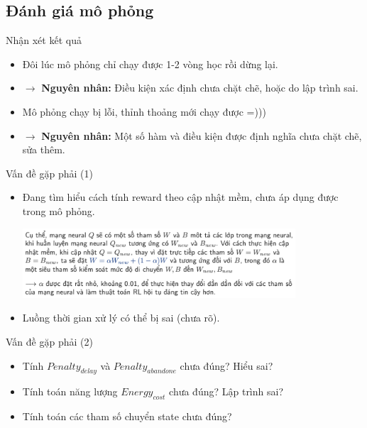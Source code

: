 \documentclass[10pt,aspectratio=169]{beamer}
\begin{document}
\subsection{Đánh giá mô phỏng}

\begin{frame}{Nhận xét kết quả}{\subsecname}
\begin{itemize}
\setlength\itemsep{8pt}
\item Đôi lúc mô phỏng chỉ chạy được 1-2 vòng học rồi dừng lại.
\item[] $ \longrightarrow $ \textbf{Nguyên nhân:} Điều kiện xác định  chưa chặt chẽ, hoặc do lập trình sai.
\item Mô phỏng chạy bị lỗi, thỉnh thoảng mới chạy được =)))
\item[] $ \longrightarrow $ \textbf{Nguyên nhân:} Một số hàm và điều kiện được định nghĩa chưa chặt chẽ, sửa thêm.
\end{itemize}
\end{frame}

\begin{frame}{Vấn đề gặp phải (1)}{\subsecname}
\begin{itemize}
\setlength\itemsep{8pt}
\item Đang tìm hiểu cách tính reward theo cập nhật mềm, chưa áp dụng được trong mô phỏng.\\
\begin{center}
\includegraphics[width=0.8\textwidth]{source/4.png}\\
\end{center}
\item Luồng thời gian xử lý có thể bị sai (chưa rõ).
\end{itemize}
\end{frame}

\begin{frame}{Vấn đề gặp phải (2)}{\subsecname}
\begin{itemize}
\setlength\itemsep{8pt}
\item Tính $ Penalty_{delay} $ và $ Penalty_{abandone} $ chưa đúng? Hiểu sai?
\item Tính toán năng lượng $ Energy_{cost} $ chưa đúng? Lập trình sai?
\item Tính toán các tham số chuyển state chưa đúng?
\end{itemize}
\end{frame}
\end{document}
